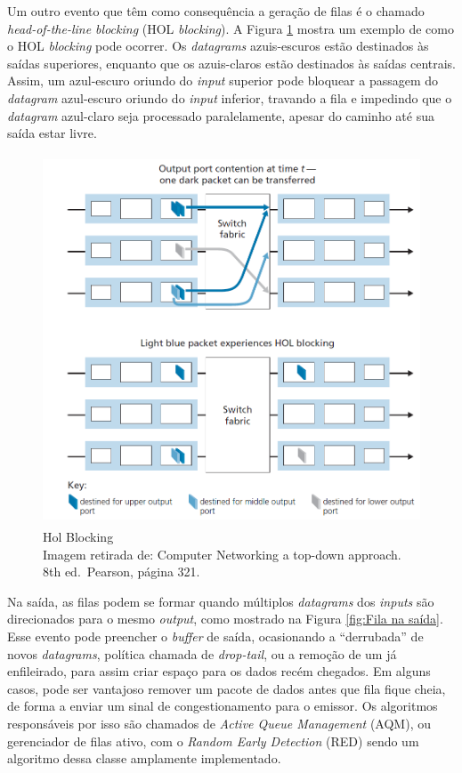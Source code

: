 Um outro evento que têm como consequência a geração de filas é o chamado
\emph{head-of-the-line blocking} (HOL \emph{blocking}). A Figura \ref{fig:Hol Blocking}
mostra um exemplo de como o HOL \emph{blocking} pode ocorrer. Os
\emph{datagrams} azuis-escuros estão destinados às saídas superiores,
enquanto que os azuis-claros estão destinados às saídas centrais. Assim,
um azul-escuro oriundo do \emph{input} superior pode bloquear a passagem
do \emph{datagram} azul-escuro oriundo do \emph{input} inferior,
travando a fila e impedindo que o \emph{datagram} azul-claro seja
processado paralelamente, apesar do caminho até sua saída estar livre.


\begin{figure}[h!]
\centering
\includegraphics[keepaspectratio, width=14cm, height=11cm]{imagens/14/14 - hol blocking.png}
\caption{Hol Blocking \\
Imagem retirada de: Computer Networking a top-down approach. 8th
ed.~Pearson, página 321. \\}
\label{fig:Hol Blocking}
\end{figure}


Na saída, as filas podem se formar quando múltiplos \emph{datagrams} dos
\emph{inputs} são direcionados para o mesmo \emph{output}, como mostrado
na Figura \ref{fig:Fila na saída}. Esse evento pode preencher o \emph{buffer} de saída,
ocasionando a ``derrubada'' de novos \emph{datagrams}, política chamada
de \emph{drop-tail}, ou a remoção de um já enfileirado, para assim criar
espaço para os dados recém chegados. Em alguns casos, pode ser vantajoso
remover um pacote de dados antes que fila fique cheia, de forma a enviar
um sinal de congestionamento para o emissor. Os algoritmos responsáveis
por isso são chamados de \emph{Active Queue Management} (AQM), ou
gerenciador de filas ativo, com o \emph{Random Early Detection} (RED)
sendo um algoritmo dessa classe amplamente implementado.


